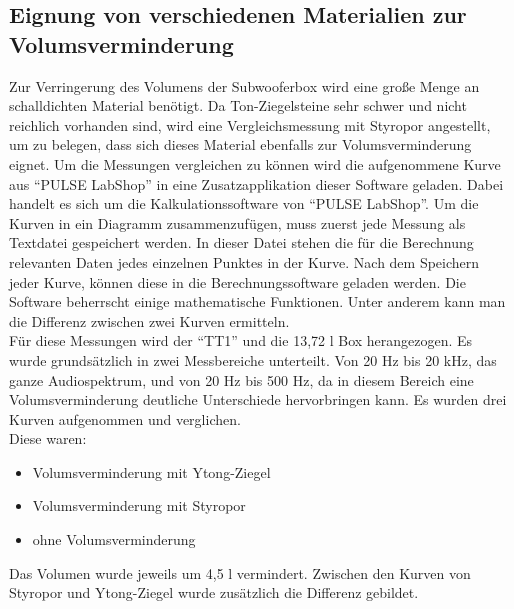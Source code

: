 \subsection{Eignung von verschiedenen Materialien zur Volumsverminderung}\label{subsec:4.4.1}
Zur Verringerung des Volumens der Subwooferbox wird eine große Menge an schalldichten Material benötigt.
Da Ton-Ziegelsteine sehr schwer und nicht reichlich vorhanden sind, wird eine Vergleichsmessung mit Styropor angestellt, um zu belegen, dass sich dieses Material ebenfalls zur Volumsverminderung eignet.
Um die Messungen vergleichen zu können wird die aufgenommene Kurve aus \enquote{PULSE LabShop} in eine Zusatzapplikation dieser Software geladen.
Dabei handelt es sich um die Kalkulationssoftware von \enquote{PULSE LabShop}.
Um die Kurven in ein Diagramm zusammenzufügen, muss zuerst jede Messung als 
Textdatei gespeichert werden.
In dieser Datei stehen die für die Berechnung relevanten Daten jedes einzelnen Punktes in der Kurve.
Nach dem Speichern jeder Kurve, können diese in die Berechnungssoftware geladen werden.
Die Software beherrscht einige mathematische Funktionen.
Unter anderem kann man die Differenz zwischen zwei Kurven ermitteln.\\ 
Für diese Messungen wird der \enquote{TT1} und die 13,72 l Box herangezogen.
Es wurde grundsätzlich in zwei Messbereiche unterteilt.
Von 20 Hz bis 20 kHz, das ganze Audiospektrum, und von 20 Hz bis 500 Hz, da in diesem Bereich eine Volumsverminderung deutliche Unterschiede hervorbringen kann.
Es wurden drei Kurven aufgenommen und verglichen.\\
Diese waren:
\begin{itemize}
	\item Volumsverminderung mit Ytong-Ziegel
	\item Volumsverminderung mit Styropor
	\item ohne Volumsverminderung
\end{itemize}
Das Volumen wurde jeweils um 4,5 l vermindert.
Zwischen den Kurven von Styropor und Ytong-Ziegel wurde zusätzlich die Differenz gebildet.

